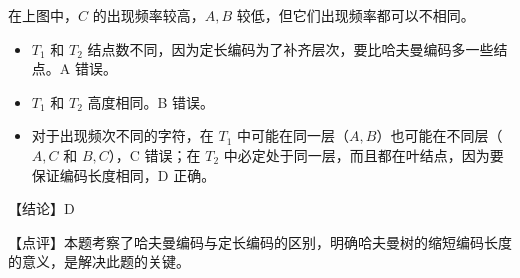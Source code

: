 \documentclass[UTF8]{ctexart}
\begin{document}
\begin{figure}[htb]
\begin{minipage}[t]{.49\textwidth}
\end{minipage}
\end{figure}

在上图中，$C$ 的出现频率较高，$A,B$ 较低，但它们出现频率都可以不相同。

\begin{itemize}
    \item $T_1$ 和 $T_2$ 结点数不同，因为定长编码为了补齐层次，要比哈夫曼编码多一些结点。A 错误。
    \item $T_1$ 和 $T_2$ 高度相同。B 错误。
    \item 对于出现频次不同的字符，在 $T_1$ 中可能在同一层（$A,B$）也可能在不同层（$A,C$ 和 $B,C$），C 错误；在 $T_2$ 中必定处于同一层，而且都在叶结点，因为要保证编码长度相同，D 正确。
\end{itemize}

{\color{cyan!80!black} 【结论】D

【点评】本题考察了哈夫曼编码与定长编码的区别，明确哈夫曼树的缩短编码长度的意义，是解决此题的关键。
}
\end{document}
